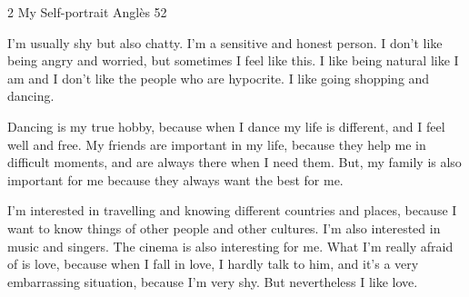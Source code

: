 %
%
\begin{news}
{2} %
{My Self-portrait}
{}
{Anglès}
{52} %

	I'm usually shy but also chatty. I'm a sensitive and honest person. I don't like being angry and worried, but sometimes I feel like this. I like being natural like I am and I don't like the people who are hypocrite. I like going shopping and  dancing.

	Dancing is my true hobby, because when I dance my life is different, and I feel well and free. My friends are important in my life, because they help me in difficult moments, and are always there when I need them. But, my family is also important for me because they always want the best for me.

	I'm interested in travelling and knowing different countries and places, because I want to know things of other people and other cultures. I'm also interested in music and singers. The cinema is also interesting for me.
What I'm really afraid of is love, because when I fall in love, I hardly talk to him, and it's a very embarrassing situation, because I'm very shy. But nevertheless I like love.


\end{news}
